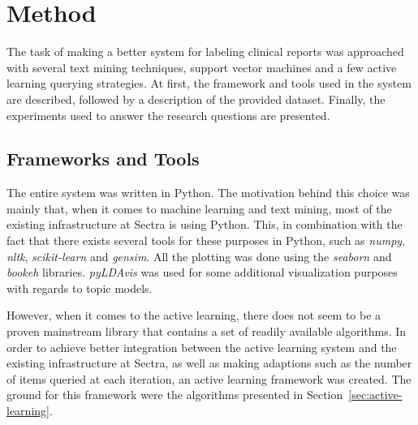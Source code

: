 \chapter{Method}
\label{cha:method}

%

The task of making a better system for labeling clinical reports was approached with several text mining techniques, support vector machines and a few active learning querying strategies.
At first, the framework and tools used in the system are described, followed by a description of the provided dataset.
Finally, the experiments used to answer the research questions are presented.

\section{Frameworks and Tools}
The entire system was written in Python.
The motivation behind this choice was mainly that, when it comes to machine learning and text mining, most of the existing infrastructure at Sectra is using Python.
This, in combination with the fact that there exists several tools for these purposes in Python, such as \textit{numpy}, \textit{nltk}, \textit{scikit-learn} and \textit{gensim}. %
All the plotting was done using the \textit{seaborn} and \textit{bookeh} libraries.
\textit{pyLDAvis} was used for some additional visualization purposes with regards to topic models.

However, when it comes to the active learning, there does not seem to be a proven mainstream library that contains a set of readily available algorithms.
In order to achieve better integration between the active learning system and the existing infrastructure at Sectra, as well as making adaptions such as the number of items queried at each iteration, an active learning framework was created.
The ground for this framework were the algorithms presented in Section~\ref{sec:active-learning}.

